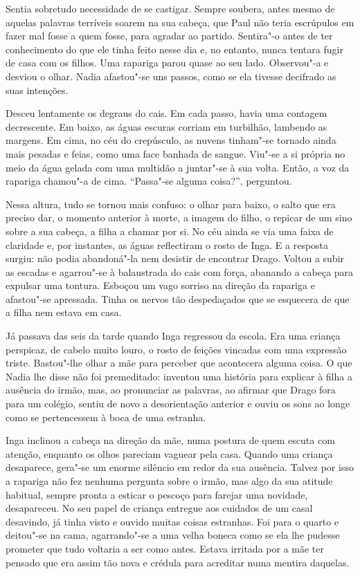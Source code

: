 Sentia sobretudo necessidade de se castigar. Sempre soubera, antes mesmo
de aquelas palavras terríveis soarem na sua cabeça, que Paul não teria
escrúpulos em fazer mal fosse a quem fosse, para agradar ao partido.
Sentira"-o antes de ter conhecimento do que ele tinha feito nesse dia e,
no entanto, nunca tentara fugir de casa com os filhos. Uma rapariga
parou quase ao seu lado. Observou"-a e desviou o olhar. Nadia afastou"-se
uns passos, como se ela tivesse decifrado as suas intenções.

Desceu lentamente os degraus do cais. Em cada passo, havia uma contagem
decrescente. Em baixo, as águas escuras corriam em turbilhão, lambendo
as margens. Em cima, no céu do crepúsculo, as nuvens tinham"-se tornado
ainda mais pesadas e feias, como uma face banhada de sangue. Viu"-se a si
própria no meio da água gelada com uma multidão a juntar"-se à sua
volta. Então, a voz da rapariga chamou"-a de cima. ``Passa"-se alguma
coisa?'', perguntou.

Nessa altura, tudo se tornou mais confuso: o olhar
para baixo, o salto que era preciso dar, o momento anterior à
morte, a imagem do filho, o repicar de um sino sobre a sua cabeça, a
filha a chamar por si. No céu ainda se via uma faixa de claridade e, por
instantes, as águas reflectiram o rosto de Inga. E a resposta surgiu:
não podia abandoná"-la nem desistir de encontrar Drago. Voltou a subir as
escadas e agarrou"-se à balaustrada do cais com força, abanando a cabeça
para expulsar uma tontura. Esboçou um vago sorriso na direção da
rapariga e afastou"-se apressada. Tinha os nervos tão despedaçados que se
esquecera de que a filha nem estava em casa.

Já passava das seis da tarde quando Inga regressou da escola. Era uma
criança perspicaz, de cabelo muito louro, o rosto de feições vincadas
com uma expressão triste. Bastou"-lhe olhar a mãe para perceber que
acontecera alguma coisa. O que Nadia lhe disse não foi premeditado:
inventou uma história para explicar à filha a ausência do irmão, mas, ao
pronunciar as palavras, ao afirmar que Drago fora para um colégio,
sentiu de novo a desorientação anterior e ouviu os sons ao longe como
se pertencessem à boca de uma estranha.

Inga inclinou a cabeça na direção da mãe, numa postura de quem escuta
com atenção, enquanto os olhos pareciam vaguear pela casa. Quando uma
criança desaparece, gera"-se um enorme silêncio em redor da sua
ausência. Talvez por isso a rapariga não fez nenhuma pergunta sobre o
irmão, mas algo da sua atitude habitual, sempre pronta a esticar o
pescoço para farejar uma novidade, desapareceu. No seu papel de
criança entregue aos cuidados de um casal desavindo, já tinha visto e
ouvido muitas coisas estranhas. Foi para o quarto e deitou"-se na cama,
agarrando"-se a uma velha boneca como se ela lhe pudesse prometer que tudo
voltaria a ser como antes. Estava irritada por a mãe ter pensado que
era assim tão nova e crédula para acreditar numa mentira daquelas.

